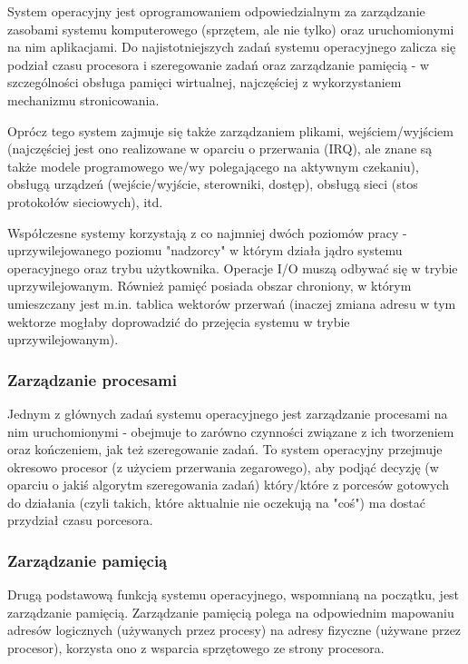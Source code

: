 \documentclass{pdfBooklets}
\begin{document}
System operacyjny jest oprogramowaniem odpowiedzialnym za zarządzanie zasobami systemu komputerowego (sprzętem, ale nie tylko) oraz uruchomionymi na nim aplikacjami. Do najistotniejszych zadań systemu operacyjnego zalicza się podział czasu procesora i szeregowanie zadań oraz zarządzanie pamięcią - w szczególności obsługa pamięci wirtualnej, najczęściej z wykorzystaniem mechanizmu stronicowania.

Oprócz tego system zajmuje się także zarządzaniem plikami, wejściem/wyjściem (najczęściej jest ono realizowane w oparciu o przerwania (IRQ), ale znane są także modele programowego we/wy polegającego na aktywnym czekaniu), obsługą urządzeń (wejście/wyjście, sterowniki, dostęp), obsługą sieci (stos protokołów sieciowych), itd.

Współczesne systemy korzystają z co najmniej dwóch poziomów pracy - uprzywilejowanego poziomu "nadzorcy" w którym działa jądro systemu operacyjnego oraz trybu użytkownika. Operacje I/O muszą odbywać się w trybie uprzywilejowanym. Również pamięć posiada obszar chroniony, w którym umieszczany jest m.in. tablica wektorów przerwań (inaczej zmiana adresu w tym wektorze mogłaby doprowadzić do przejęcia systemu w trybie uprzywilejowanym).

\subsubsection{Zarządzanie procesami}

Jednym z głównych zadań systemu operacyjnego jest zarządzanie procesami na nim uruchomionymi - obejmuje to zarówno czynności związane z ich tworzeniem oraz kończeniem, jak też szeregowanie zadań. To system operacyjny przejmuje okresowo procesor (z użyciem przerwania zegarowego), aby podjąć decyzję (w oparciu o jakiś algorytm szeregowania zadań) który/które z porcesów gotowych do działania (czyli takich, które aktualnie nie oczekują na "coś") ma dostać przydział czasu porcesora.

\subsubsection{Zarządzanie pamięcią}

Drugą podstawową funkcją systemu operacyjnego, wspomnianą na początku, jest zarządzanie pamięcią. Zarządzanie pamięcią polega na odpowiednim mapowaniu adresów logicznych (używanych przez procesy) na adresy fizyczne (używane przez procesor), korzysta ono z wsparcia sprzętowego ze strony procesora.
\end{document}
